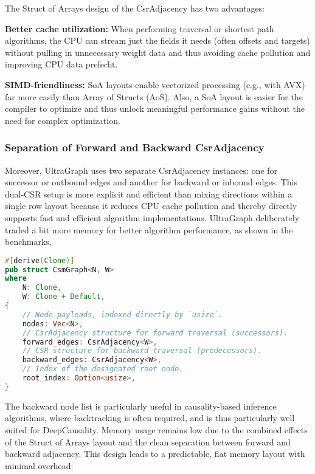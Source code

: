 The Struct of Arrays design of the CsrAdjacency has two advantages:


\textbf{Better cache utilization:} When performing traversal or shortest path algorithms, the CPU can stream just the fields it needs (often offsets and targets) without pulling in unnecessary weight data and thus avoiding cache pollution and improving CPU data prefecht.

\textbf{SIMD-friendliness:} SoA layouts enable vectorized processing (e.g., with AVX) far more easily 
than Array of Structs (AoS). Also, a SoA layout is easier for the compiler to optimize and thus unlock
meaningful performance gains without the need for complex optimization. 


\subsubsection{Separation of Forward and Backward CsrAdjacency}

Moreover, UltraGraph uses two separate CsrAdjacency instances: one for successor or outbound edges and another for backward or inbound edges. This dual-CSR setup is more explicit and efficient than mixing directions within a single row layout because it reduces CPU cache pollution and thereby directly supports fast and efficient algorithm implementations. UltraGraph deliberately traded a bit more
memory for better algorithm performance, as shown in the benchmarks.


\begin{lstlisting}[language=Rust, label={list:SeparatedCsrAdjacency}, caption={UltraGraph: Forward and Backward CsrAdjacency}]
#[derive(Clone)]
pub struct CsmGraph<N, W>
where
    N: Clone,
    W: Clone + Default,
{
    // Node payloads, indexed directly by `usize`.
    nodes: Vec<N>,
    // CsrAdjacency structure for forward traversal (successors).
    forward_edges: CsrAdjacency<W>,
    // CSR structure for backward traversal (predecessors).
    backward_edges: CsrAdjacency<W>,
    // Index of the designated root node.
    root_index: Option<usize>,
}
\end{lstlisting}


The backward node list is particularly useful in causality-based inference algorithms, where backtracking is often required, and is thus particularly well suited for DeepCausality. Memory usage remains low due to the combined effects of the Struct of Arrays layout and the clean separation between forward and backward adjacency. This design leads to a predictable, flat memory layout with minimal overhead:

